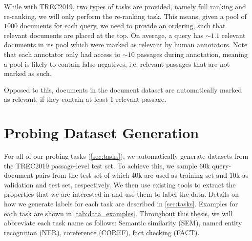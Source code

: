 While with TREC2019, two types of tasks are provided, namely full ranking and re-ranking, we will only perform the re-ranking task. This means, given a pool of $1000$ documents for each query, we need to provide an ordering, such that relevant documents are placed at the top. On average, a query has $\sim 1.1$ relevant documents in its pool which were marked as relevant by human annotators. Note that each annotator only had access to $\sim 10$ passages during annotation, meaning a pool is likely to contain false negatives, i.e. relevant passages that are not marked as such.

Opposed to this, documents in the document dataset are automatically marked as relevant, if they contain at least $1$ relevant passage.

\section{Probing Dataset Generation}
\label{sec:dataset_gen}
For all of our probing tasks (\autoref{sec:tasks}), we automatically generate datasets from the TREC2019 passage-level test set. To achieve this, we sample $60$k query-document pairs from the test set of which $40$k are used as training set and $10$k as validation and test set, respectively. We then use existing tools to extract the properties that we are interested in and use them to label the data. Details on how we generate labels for each task are described in \autoref{sec:tasks}. Examples for each task are shown in \autoref{tab:data_examples}. Throughout this thesis, we will abbreviate each task name as follows: Semantic similarity (SEM), named entity recognition (NER), coreference (COREF), fact checking (FACT).

